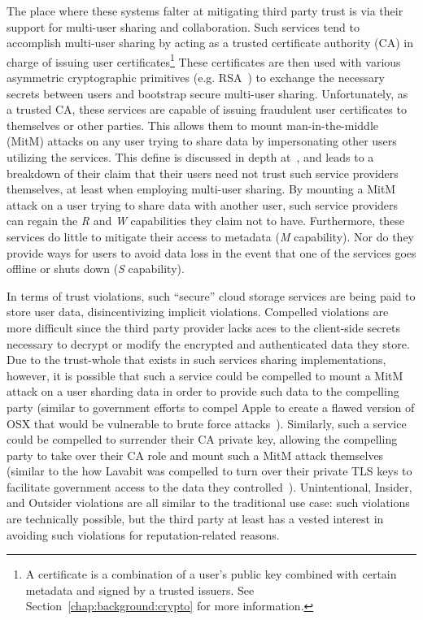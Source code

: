 The place where these systems falter at mitigating third party trust
is via their support for multi-user sharing and collaboration. Such
services tend to accomplish multi-user sharing by acting as a trusted
certificate authority (CA) in charge of issuing user
certificates\footnote{A certificate is a combination of a user's
  public key combined with certain metadata and signed by a trusted
  issuers. See Section~\ref{chap:background:crypto} for more
  information.} These certificates are then used with various
asymmetric cryptographic primitives (e.g. RSA~\cite{rivest1978}) to
exchange the necessary secrets between users and bootstrap secure
multi-user sharing. Unfortunately, as a trusted CA, these services are
capable of issuing fraudulent user certificates to themselves or other
parties. This allows them to mount man-in-the-middle (MitM) attacks on
any user trying to share data by impersonating other users utilizing
the services. This define is discussed in depth at~\cite{wilson2014},
and leads to a breakdown of their claim that their users need not
trust such service providers themselves, at least when employing
multi-user sharing. By mounting a MitM attack on a user trying to
share data with another user, such service providers can regain the
\emph{R} and \emph{W} capabilities they claim not to
have. Furthermore, these services do little to mitigate their access
to metadata (\emph{M} capability). Nor do they provide ways for
users to avoid data loss in the event that one of the services goes
offline or shuts down (\emph{S} capability).

In terms of trust violations, such ``secure'' cloud storage services
are being paid to store user data, disincentivizing implicit
violations. Compelled violations are more difficult since the third
party provider lacks aces to the client-side secrets necessary to
decrypt or modify the encrypted and authenticated data they store. Due
to the trust-whole that exists in such services sharing
implementations, however, it is possible that such a service could be
compelled to mount a MitM attack on a user sharding data in order to
provide such data to the compelling party (similar to government
efforts to compel Apple to create a flawed version of OSX that would
be vulnerable to brute force attacks~\cite{ars-cookvfbi}). Similarly,
such a service could be compelled to surrender their CA private key,
allowing the compelling party to take over their CA role and mount
such a MitM attack themselves (similar to the how Lavabit was
compelled to turn over their private TLS keys to facilitate government
access to the data they
controlled~\cite{levsion-lavabit}). Unintentional, Insider, and
Outsider violations are all similar to the traditional use case: such
violations are technically possible, but the third party at least has
a vested interest in avoiding such violations for reputation-related
reasons.


